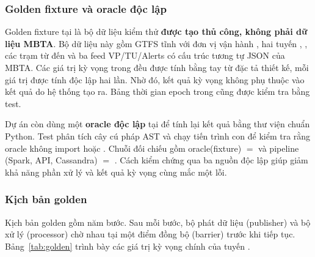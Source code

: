 \subsubsection{Golden fixture và oracle độc lập}

Golden fixture tại  là bộ dữ liệu kiểm thử \textbf{được tạo thủ công, không phải dữ liệu MBTA}. Bộ dữ liệu này gồm GTFS tĩnh với đơn vị vận hành , hai tuyến , , các trạm từ  đến  và ba feed VP/TU/Alerts có cấu trúc tương tự JSON của MBTA. Các giá trị kỳ vọng trong  đều được tính bằng tay từ đặc tả thiết kế, mỗi giá trị được tính độc lập hai lần. Nhờ đó, kết quả kỳ vọng không phụ thuộc vào kết quả do hệ thống tạo ra. Bảng thời gian epoch trong  cũng được kiểm tra bằng test.

Dự án còn dùng một \textbf{oracle độc lập} tại  để tính lại kết quả bằng thư viện chuẩn Python. Test  phân tích cây cú pháp AST và chạy tiến trình con để kiểm tra rằng oracle không import  hoặc . Chuỗi đối chiếu gồm oracle(fixture) $=$  và pipeline (Spark, API, Cassandra) $=$ . Cách kiểm chứng qua ba nguồn độc lập giúp giảm khả năng phần xử lý và kết quả kỳ vọng cùng mắc một lỗi.

\subsubsection{Kịch bản golden}

Kịch bản golden gồm năm bước. Sau mỗi bước, bộ phát dữ liệu (publisher) và bộ xử lý (processor) chờ nhau tại một điểm đồng bộ (barrier) trước khi tiếp tục. Bảng~\ref{tab:golden} trình bày các giá trị kỳ vọng chính của tuyến .

